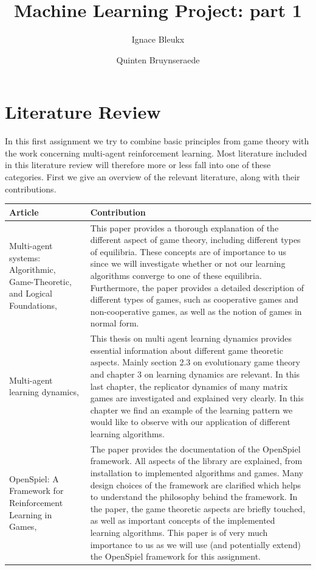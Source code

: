 \documentclass[10pt,a4paper]{article}
\author{Ignace Bleukx \and Quinten Bruynseraede}
\title{Machine Learning Project: part 1}
\begin{document}
\maketitle

\section{Literature Review}
In this first assignment we try to combine basic principles from game theory with the work concerning multi-agent reinforcement learning. Most literature included in this literature review will therefore more or less fall into one of these categories. First we give an overview of the relevant literature, along with their contributions.


\bigskip
\begin{longtable}{|p{4cm}|p{12cm}|}
\hline 
Article & Contribution \\ 
\hline 
\hline
Multi-agent systems: Algorithmic, Game-Theoretic, and Logical Foundations, \citet{mas} & This paper provides a thorough explanation of the different aspect of game theory, including different types of equilibria. These concepts are of importance to us since we will investigate whether or not our learning algorithms converge to one of these equilibria. Furthermore, the paper provides a detailed description of different types of games, such as cooperative games and non-cooperative games, as well as the notion of games in normal form.   \\ 
\hline 
Multi-agent learning dynamics, \citet{phdthesis} &  This thesis on multi agent learning dynamics provides essential information about different game theoretic aspects. Mainly section 2.3 on evolutionary game theory and chapter 3 on learning dynamics are relevant. In this last chapter, the replicator dynamics of many matrix games are investigated and explained very clearly. In this chapter we find an example of the learning pattern we would like to observe with our application of different learning algorithms.   \\
\hline 
OpenSpiel: A Framework for Reinforcement Learning in Games, \citet{lanctot2019openspiel} & The paper provides the documentation of the OpenSpiel framework. All aspects of the library are explained, from installation to implemented algorithms and games. Many design choices of the framework are clarified which helps to understand the philosophy behind the framework. In the paper, the game theoretic aspects are briefly touched, as well as important concepts of the implemented learning algorithms. This paper is of very much importance to us as we will use (and potentially extend) the OpenSpiel framework for this assignment. \\ 

\end{longtable}
\end{document}
